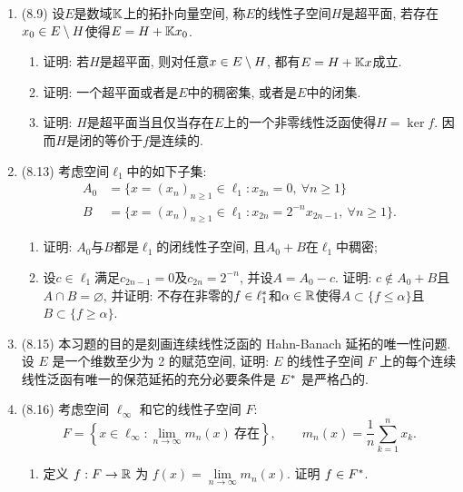 \begin{enumerate}[label=\textbf{\arabic*.}, ref=\arabic*]
\begin{enumerate}[(1)]
            \end{enumerate}
        \item (8.9) 设$ E $是数域$ \mathbb{K} $上的拓扑向量空间, 称$ E $的线性子空间$ H $是超平面, 若存在$ x_0\in E\setminus H $使得$ E=H+\mathbb{K} x_0 $.
            \begin{enumerate}[(1)]
            \item 证明: 若$ H $是超平面, 则对任意$ x\in E\setminus H $, 都有$ E=H+\mathbb{K} x $成立.
            \item 证明: 一个超平面或者是$ E $中的稠密集, 或者是$ E $中的闭集.
            \item 证明: $ H $是超平面当且仅当存在$ E $上的一个非零线性泛函使得$ H=\ker f $. 因而$ H $是闭的等价于$ f $是连续的.
            \end{enumerate}
        \item (8.13) 考虑空间$ \ell_1 $中的如下子集:
            \[
            \begin{aligned}
            A_0&=\{ x=(x_n)_{n\geqslant 1}\in\ell_1 : x_{2n}=0,\ \forall n\geqslant 1 \}\\
            B&=\{ x=(x_n)_{n\geqslant 1}\in\ell_1 : x_{2n}=2^{-n}x_{2n-1},\ \forall n\geqslant 1 \}.
            \end{aligned}
            \]
            \begin{enumerate}[(1)]
            \item 证明: $ A_0 $与$ B $都是$ \ell_1 $的闭线性子空间, 且$ A_0+B $在$\ell_1 $中稠密;
            \item 设$ c\in\ell_1 $满足$ c_{2n-1}=0 $及$ c_{2n}=2^{-n} $, 并设$ A=A_0-c $. 证明: $ c\notin A_0+B $且$ A\cap B=\varnothing $, 并证明: 不存在非零的$ f\in\ell_1^{*} $和$ \alpha\in\mathbb{R} $使得$ A\subset\{ f\leqslant\alpha \} $且$ B\subset\{ f\geqslant\alpha \} $.
            \end{enumerate}
        \item (8.15) 本习题的目的是刻画连续线性泛函的 Hahn-Banach 延拓的唯一性问题. 设 $ E $ 是一个维数至少为 2 的赋范空间, 证明: $ E $ 的线性子空间 $ F $ 上的每个连续线性泛函有唯一的保范延拓的充分必要条件是 $ E^{*} $ 是严格凸的.
        \item (8.16) 考虑空间 $ \ell_{\infty} $ 和它的线性子空间 $ F $:
            \[
                F = \left\{ x\in\ell_{\infty}:\lim_{n\to\infty} m_{n}(x)\ \text{存在} \right\}, \qquad m_{n}(x)=\frac{1}{n}\sum_{k=1}^{n} x_{k}.
            \]
            \begin{enumerate}[(1)]
                \item 定义 $ f:F\to\mathbb{R} $ 为 $ f(x)=\lim\limits_{n\to\infty}m_{n}(x) $. 证明 $ f\in F^{*} $.

\end{enumerate}
\end{enumerate}
